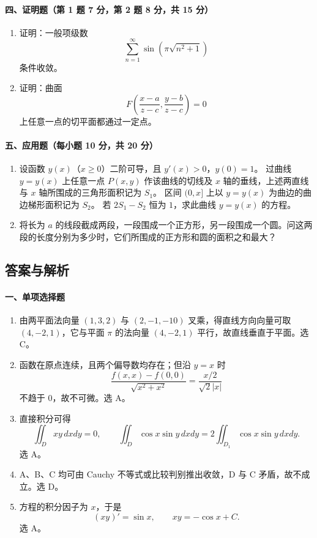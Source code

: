 \paragraph{四、证明题（第 1 题 7 分，第 2 题 8 分，共 15 分）}

\begin{enumerate}
  \item 证明：一般项级数
  \[
    \sum_{n=1}^{\infty}\sin\left(\pi\sqrt{n^2+1}\right)
  \]
  条件收敛。

  \item 证明：曲面
  \[
    F\left(\frac{x-a}{z-c},\frac{y-b}{z-c}\right)=0
  \]
  上任意一点的切平面都通过一定点。
\end{enumerate}

\paragraph{五、应用题（每小题 10 分，共 20 分）}

\begin{enumerate}
  \item 设函数 $y(x)$（$x\ge 0$）二阶可导，且 $y'(x)>0$，$y(0)=1$。
  过曲线 $y=y(x)$ 上任意一点 $P(x,y)$ 作该曲线的切线及 $x$ 轴的垂线，上述两直线与 $x$ 轴所围成的三角形面积记为 $S_1$。
  区间 $(0,x]$ 上以 $y=y(x)$ 为曲边的曲边梯形面积记为 $S_2$。
  若 $2S_1-S_2$ 恒为 $1$，求此曲线 $y=y(x)$ 的方程。

  \item 将长为 $a$ 的线段截成两段，一段围成一个正方形，另一段围成一个圆。问这两段的长度分别为多少时，它们所围成的正方形和圆的面积之和最大？
\end{enumerate}

\subsection{答案与解析}

\paragraph{一、单项选择题}
\begin{enumerate}
  \item 由两平面法向量 $(1,3,2)$ 与 $(2,-1,-10)$ 叉乘，得直线方向向量可取 $(4,-2,1)$，它与平面 $\pi$ 的法向量 $(4,-2,1)$ 平行，故直线垂直于平面。选 C。
  \item 函数在原点连续，且两个偏导数均存在；但沿 $y=x$ 时
  \[
  \frac{f(x,x)-f(0,0)}{\sqrt{x^2+x^2}}=\frac{x/2}{\sqrt2|x|}
  \]
  不趋于 $0$，故不可微。选 A。
  \item 直接积分可得
  \[
  \iint_Dxy\,dxdy=0,\qquad
  \iint_D\cos x\sin y\,dxdy=2\iint_{D_1}\cos x\sin y\,dxdy.
  \]
  选 A。
  \item A、B、C 均可由 Cauchy 不等式或比较判别推出收敛，D 与 C 矛盾，故不成立。选 D。
  \item 方程的积分因子为 $x$，于是
  \[
  (xy)'=\sin x,\qquad xy=-\cos x+C.
  \]
  选 A。
\end{enumerate}

